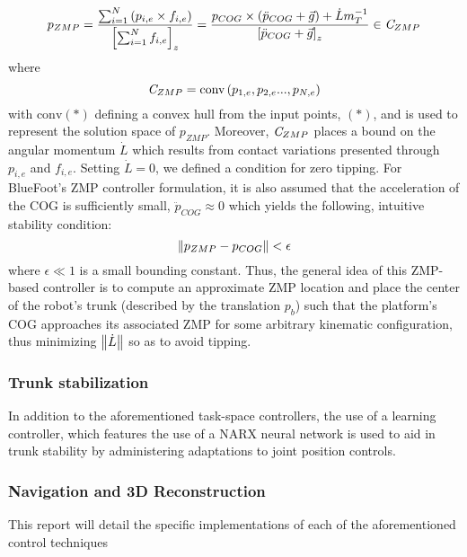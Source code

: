 			\begin{equation}
				p_{ZMP} 
				= 
				\frac{ \sum_{i=1}^{N} \left( p_{i,e} \times f_{i,e} \right) }{ \left[\sum_{i=1}^{N} f_{i,e}\right]_{z} }
				= 
				\frac{ 	p_{COG} \times \left( \ddot{p}_{COG} + \vec{g} \right) + \dot{L}m_{T}^{-1} }{ \left[ \ddot{p}_{COG} + \vec{g} \right]_{z}}
				\in \emph{C}_{ZMP} 
			\end{equation}
		where
			\begin{equation}
				\emph{C}_{ZMP} = \text{conv}\left(p_{1,e},p_{2,e}...,p_{N,e}\right)
			\end{equation}
		with $\text{conv}(*)$ defining a convex hull from the  input points, $(*)$, and is used to represent the solution space of $p_{ZMP}$. Moreover, $\emph{C}_{ZMP}$ places a bound on the angular momentum $\dot{L}$ which results from contact variations presented through $p_{i,e}$ and $f_{i,e}$. Setting $\dot{L}=0$, we defined a condition for zero tipping. For BlueFoot's ZMP controller formulation, it is also assumed that the acceleration of the COG is sufficiently small, \IE $\ddot{p}_{COG}\approx0$ which yields the following, intuitive stability condition:
			\begin{equation}
				\left\lVert p_{ZMP} - p_{COG}\right\rVert < \epsilon
			\end{equation}
		where $\epsilon\ll1$ is a small bounding constant. Thus, the general idea of this ZMP-based controller is to compute an approximate ZMP location and place the center of the robot's trunk (described by the translation $p_{b}$) such that the platform's COG approaches its associated ZMP for some arbitrary kinematic configuration, thus minimizing $\left\lVert\dot{L}\right\rVert$ so as to avoid tipping.


		\subsubsection{Trunk stabilization}

		In addition to the aforementioned task-space controllers, the use of a learning controller, which features the use of a NARX neural network is used to aid in trunk stability by administering adaptations to joint position controls.
			

		\subsubsection{Navigation and 3D Reconstruction}


		This report will detail the specific implementations of each of the aforementioned control techniques
